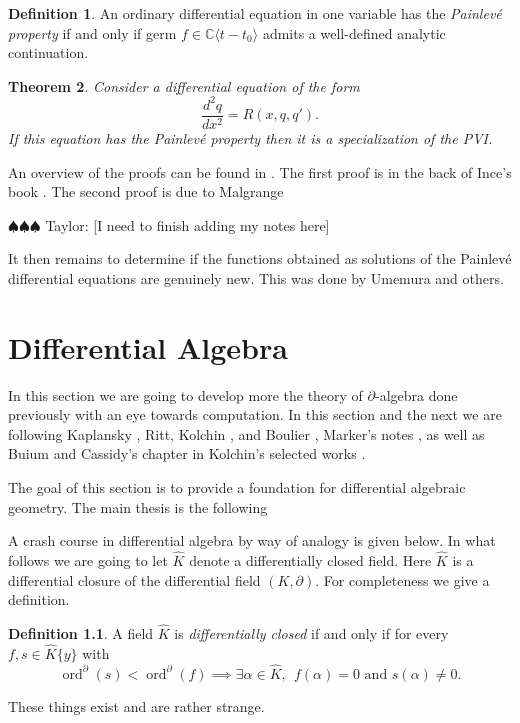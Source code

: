 \documentclass[12pt]{book}
\newcommand{\taylor}[1]{{\color{blue} \sf $\spadesuit\spadesuit\spadesuit$ Taylor: [#1]}}
\numberwithin{equation}{section}
\newtheorem{theorem}{Theorem}[subsection]
\theoremstyle{definition}
\newtheorem{definition}[theorem]{Definition}
\theoremstyle{remark}
\newcommand{\CC}{\mathbb{C}}
\newcommand{\ord}{\operatorname{ord}}
\newcommand{\Khat}{\widehat{K}}
\begin{document}
\begin{definition}
	An ordinary differential equation in one variable has the \emph{Painlev\'e property} if and only if germ $f\in\CC\langle t-t_0\rangle$ admits a well-defined analytic continuation.
\end{definition}

\begin{theorem}
	Consider a differential equation of the form 
	$$ \dfrac{d^2q}{dx^2} = R(x,q,q'). $$
	If this equation has the Painlev\'{e} property then it is a specialization of the PVI.
\end{theorem}

An overview of the proofs can be found in \cite{Shimomura2003}.
The first proof is in the back of Ince's book \cite{Ince1944}. 
The second proof is due to Malgrange 

\taylor{I need to finish adding my notes here}


It then remains to determine if the functions obtained as solutions of the Painlev\'e differential equations are genuinely new. 
This was done by Umemura and others. 


\chapter{Differential Algebra}

In this section we are going to develop more the theory of $\partial$-algebra done previously with an eye towards computation. 
In this section and the next we are following Kaplansky \cite{Kaplansky1976}, Ritt\cite{Ritt1950}, Kolchin \cite{Kolchin1973}, and Boulier \cite[\href{https://hal.archives-ouvertes.fr/hal-02378197v2/document}{online version}]{Boulier2019}, Marker's notes \cite{Marker2000}, as well as Buium and Cassidy's chapter in Kolchin's selected works \cite{Kolchin1999}.

The goal of this section is to provide a foundation for differential algebraic geometry. 
The main thesis is the following

A crash course in differential algebra by way of analogy is given below. 
In what follows we are going to let $\Khat$ denote a differentially closed field. 
Here $\widehat{K}$ is a differential closure of the differential field $(K,\partial)$. 
For completeness we give a definition.
\begin{definition}
	A field $\widehat{K}$ is \emph{differentially closed} if and only if for every $f,s\in \Khat\lbrace y\rbrace$ with 
	$$\ord^{\partial}(s)<\ord^{\partial}(f) \implies \exists \alpha \in \Khat, \ \ f(\alpha)=0 \mbox{ and } s(\alpha)\neq 0. $$
\end{definition}
These things exist and are rather strange.
\end{document}
